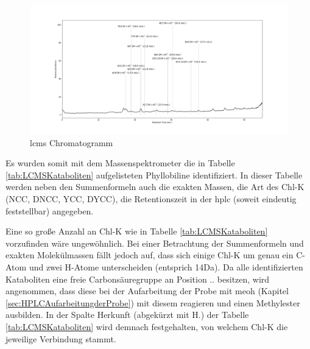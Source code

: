 \begin{figure}[!htbp]
  \includegraphics[width=\textwidth]{figures/Kapitel6/keineReaktion/Kuerbis_Analyse_keineReaktion2_Ganzes_Spektrum.png}
  \caption[LC-MS Chromatogramm vor der Reaktion, Quelle: Author]{\gls{lcms} Chromatogramm}
  \label{fig:LCMSChromatogramm}
\end{figure}

Es wurden somit mit dem Massenspektrometer die in Tabelle \ref{tab:LCMSKataboliten} aufgelisteten Phyllobiline identifiziert. In dieser Tabelle werden neben den Summenformeln auch die exakten Massen, die Art des \gls{Chl-K} (NCC, DNCC, YCC, DYCC), die Retentionszeit in der \gls{hplc} (soweit eindeutig feststellbar) angegeben. 

Eine so große Anzahl an \gls{Chl-K} wie in Tabelle \ref{tab:LCMSKataboliten} vorzufinden wäre ungewöhnlich. Bei einer Betrachtung der Summenformeln und exakten Molekülmassen fällt jedoch auf, dass sich einige \gls{Chl-K} um genau ein C-Atom und zwei H-Atome unterscheiden (entsprich 14Da). Da alle identifizierten Kataboliten eine freie Carbonsäuregruppe an Position .. besitzen, wird angenommen, dass diese bei der Aufarbeitung der Probe mit \gls{meoh} (Kapitel \ref{sec:HPLCAufarbeitungderProbe}) mit diesem reagieren und einen Methylester ausbilden. In der Spalte Herkunft (abgekürzt mit H.) der Tabelle \ref{tab:LCMSKataboliten} wird demnach festgehalten, von welchem \gls{Chl-K} die jeweilige Verbindung stammt. \\

